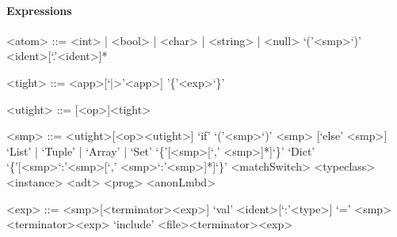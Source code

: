 \documentclass[11pt]{article} %
\begin{document}
\paragraph{Expressions}

\begin{grammar}

<atom> ::= <int> | <bool> | <char> | <string> | <null>
\alt `('<smp>`)'
\alt <ident>[`.'<ident>]*

<tight> ::= <app>[`|>'<app>]
\alt '\{'<exp>`\}'

<utight> ::= [<op>]<tight>

<smp> ::= <utight>[<op><utight>]
\alt `if' `('<smp>`)' <smp> [`else' <smp>]
\alt `List' | `Tuple' | `Array' | `Set' `\{'[<smp>[`,' <smp>]*]`\}'
\alt `Dict' `\{'[<smp>`:'<smp>[`,' <smp>`:'<smp>]*]`\}'
\alt <matchSwitch>
\alt <typeclass>
\alt <instance>
\alt <adt>
\alt <prog>
\alt <anonLmbd>

<exp> ::= <smp>[<terminator><exp>]
\alt [`lazy'] `val' <ident>[`:'<type>] `=' <smp><terminator><exp>
\alt `include' <file><terminator><exp>

\end{grammar}
\end{document}
